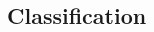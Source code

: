 \documentclass[10pt, oneside]{article}
\begin{document}
\begin{multicols}{2}








\section{Classification}


\end{multicols}
\end{document}

